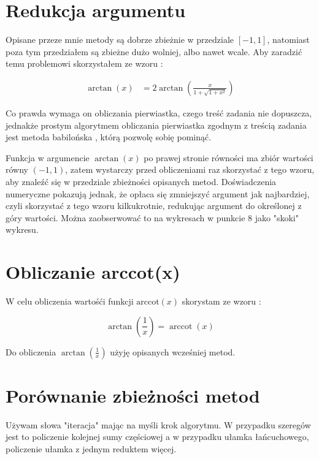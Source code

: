 \documentclass{article}
\begin{document}
\section{Redukcja argumentu}

Opisane przeze mnie metody są dobrze zbieżnie w przedziale $[-1,1]$, natomiast poza tym przedziałem są zbieżne dużo wolniej, albo nawet wcale.
Aby zaradzić temu problemowi skorzystałem ze wzoru \cite{wiki}:

\begin{equation}
	{\begin{aligned}\arctan(x)&=2\arctan \left({\frac {x}{1+{\sqrt {1+x^{2}}}}}\right)\end{aligned}}
\end{equation}

Co prawda wymaga on obliczania pierwiastka, czego treść zadania nie dopuszcza, jednakże prostym algorytmem obliczania pierwiastka zgodnym z treścią zadania jest metoda babilońska \cite{babylon}, którą pozwolę sobię pominąć.
\linebreak

Funkcja w argumencie $\arctan(x)$ po prawej stronie równości ma zbiór wartości równy $(-1,1)$, zatem wystarczy przed obliczeniami raz skorzystać z tego wzoru, aby znaleźć się w przedziale zbieżności opisanych metod.
Doświadczenia numeryczne pokazują jednak, że opłaca się zmniejszyć argument jak najbardziej, czyli skorzystać z tego wzoru kilkukrotnie, redukując argument do określonej z góry wartości. Można zaobserwować to na wykresach w punkcie 8 jako "skoki" wykresu.

\section{Obliczanie arccot(x)}
W celu obliczenia wartośći funkcji $\textrm{arccot}(x)$ skorystam ze wzoru \cite{wiki}:

\begin{equation}
\arctan \left({\frac {1}{x}}\right)=\operatorname {arccot}(x)
\end{equation}

\noindent
Do obliczenia $\arctan(\frac{1}{x})$ użyję opisanych wcześniej metod.

\clearpage
\section{Porównanie zbieżności metod}

Używam słowa "iteracja" mając na myśli krok algorytmu. W przypadku szeregów jest to policzenie kolejnej sumy częściowej a w przypadku ułamka łańcuchowego, policzenie ułamka z jednym reduktem więcej.
\end{document}
